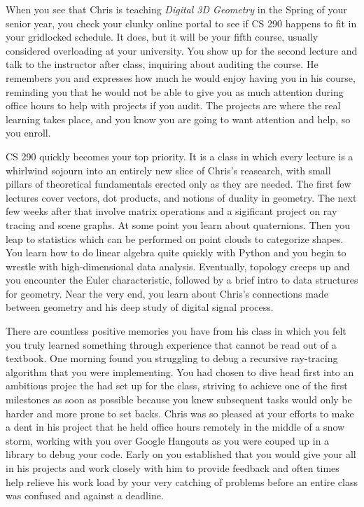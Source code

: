 \documentclass[../main.tex]{subfiles}
\begin{document}
When you see that Chris is teaching \textit{Digital 3D Geometry} in the Spring of your senior year, you check your clunky online portal to see if CS 290 happens to fit in your gridlocked schedule. It does, but it will be your fifth course, usually considered overloading at your university. You show up for the second lecture and talk to the instructor after class, inquiring about auditing the course. He remembers you and expresses how much he would enjoy having you in his course, reminding you that he would not be able to give you as much attention during office hours to help with projects if you audit. The projects are where the real learning takes place, and you know you are going to want attention and help, so you enroll.

CS 290 quickly becomes your top priority. It is a class in which every lecture is a whirlwind sojourn into an entirely new slice of Chris's reasearch, with small pillars of theoretical fundamentals erected only as they are needed. The first few lectures cover vectors, dot products, and notions of duality in geometry. The next few weeks after that involve matrix operations and a sigificant project on ray tracing and scene graphs. At some point you learn about quaternions. Then you leap to statistics which can be performed on point clouds to categorize shapes. You learn how to do linear algebra quite quickly with Python and you begin to wrestle with high-dimensional data analysis. Eventually, topology creeps up and you encounter the Euler characteristic, followed by a brief intro to data structures for geometry. Near the very end, you learn about Chris's connections made between geometry and his deep study of digital signal process.

There are countless positive memories you have from his class in which you felt you truly learned something through experience that cannot be read out of a textbook. One morning found you struggling to debug a recursive ray-tracing algorithm that you were implementing. You had chosen to dive head first into an ambitious projec the had set up for the class, striving to achieve one of the first milestones as soon as possible because you knew subsequent tasks would only be harder and more prone to set backs. Chris was so pleased at your efforts to make a dent in his project that he held office hours remotely in the middle of a snow storm, working with you over Google Hangouts as you were couped up in a library to debug your code. Early on you established that you would give your all in his projects and work closely with him to provide feedback and often times help relieve his work load by your very catching of problems before an entire class was confused and against a deadline.
\end{document}
